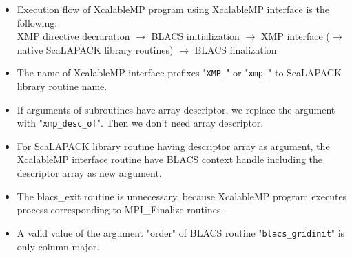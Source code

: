 \begin{itemize}
\item Execution flow of XcalableMP program using XcalableMP interface is the following:\\
      XMP directive decraration $\to$ BLACS initialization $\to$ 
      XMP interface ($\to$ native ScaLAPACK library routines)  $\to$ BLACS finalization
\item The name of XcalableMP interface prefixes "{\tt XMP\_}" or "{\tt xmp\_}" 
      to ScaLAPACK library routine name.
\item If arguments of subroutines have array descriptor,
      we replace the argument with "{\tt xmp\_desc\_of}".
      Then we don't need array descriptor. 
\item For ScaLAPACK library routine having descriptor array as argument,
      the XcalableMP interface routine have BLACS context handle including 
      the descriptor array as new argument.
\item The blacs\_exit routine is unnecessary, because XcalableMP program executes process 
      corresponding to MPI\_Finalize routines.
\item A valid value of the argument "order" of BLACS routine "{\tt blacs\_gridinit}" is 
      only column-major. 
\end{itemize}

